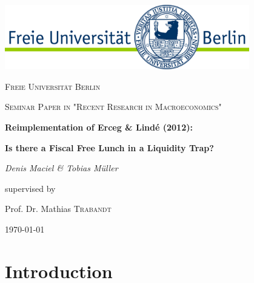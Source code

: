 \documentclass[12pt,a4paper,oneside,titlepage]{article}
\begin{document}
\parindent 0pt %
\begin{titlepage}
	\centering
	\includegraphics[width=0.8\textwidth]{pictures/LogoFU}\par\vspace{1cm}
	{\scshape\large Freie Universität Berlin \par}
	\vspace{1cm}
	{\scshape\large Seminar Paper in "Recent Research in Macroeconomics"\par}
	\vspace{1.5cm}
	{\LARGE\bfseries Reimplementation of Erceg \& Lindé (2012):\par}
	\vspace{0.5cm}
	{\Large\bfseries Is there a Fiscal Free Lunch in a Liquidity Trap?\par}
	\vspace{2cm}
	{\Large\itshape Denis Maciel \& Tobias Müller\par}
	\vfill
	supervised by\par
	Prof. Dr. Mathias \textsc{Trabandt}

	\vfill

	{\large \today\par}
\end{titlepage}


\doublespacing
\tableofcontents

\pagebreak[4]
\listoffigures
\listoftables
\newpage

\section{Introduction}
\end{document}

